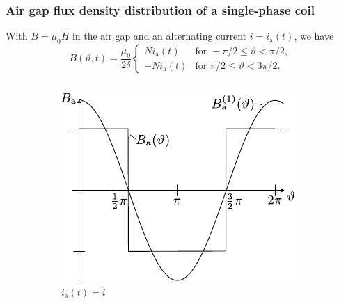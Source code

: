 \begin{frame}
	\frametitle{Air gap flux density distribution of a single-phase coil}
    With $B=\mu_0 H$ in the air gap and an alternating current $i = i_\mathrm{a}(t)$, we have
    \begin{equation}
        B(\vartheta, t) = \frac{\mu_0}{2\delta} \begin{cases}
            N i_\mathrm{a}(t) & \text{for } -\pi/2 \leq \vartheta < \pi/2, \\
            -N i_\mathrm{a}(t) & \text{for } \pi/2 \leq \vartheta < 3\pi/2.
        \end{cases}
    \end{equation}
    \begin{figure}
        \begin{columns}
            \begin{column}{0.7\textwidth}
                \centering
		\begin{subfigure}[b]{0.45\textwidth}
			\centering
			\includegraphics[width=\textwidth]{fig/lec05/B_single_phase_full_current.pdf}
			\caption{$i_\mathrm{a}(t) = \hat{i}$}
		\end{subfigure}
		\hfill
		\begin{subfigure}[b]{0.45\textwidth}
			\centering

\end{subfigure}
\end{column}
\end{columns}
\end{figure}
\end{frame}
